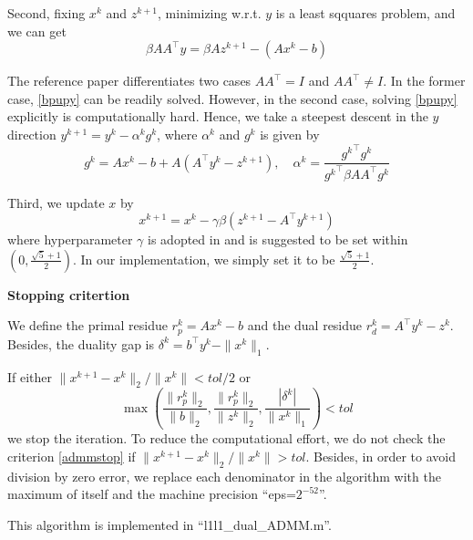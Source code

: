\documentclass[conference,onecolumn,12pt]{IEEEtran}
\newcommand{\<}{\langle}
\renewcommand{\>}{\rangle}
\numberwithin{equation}{section}
\begin{document}
Second, fixing $x^k$ and $z^{k+1}$, minimizing w.r.t. $y$ is a least sqquares problem, and we can get
\begin{equation}
    \label{bpupy}
    \beta AA^\top y = \beta A z^{k+1}-(Ax^k-b)
\end{equation}

The reference paper \cite{yang2011alternating} differentiates two cases $AA^\top=I$ and $AA^\top \neq I$. In the former case, \ref{bpupy} can be readily solved. However, in the second case, solving \ref{bpupy} explicitly is computationally hard. Hence, we take a steepest descent in the $y$ direction $y^{k+1}=y^k-\alpha^k g^k$, where $\alpha^k$ and $g^k$ is given by
\begin{equation}
    g^k = Ax^k-b +A(A^\top y^k-z^{k+1}),\quad \alpha^k = \frac{{g^k}^\top g^k}{{g^k}^\top\beta AA^\top g^k}
\end{equation}

Third, we update $x$ by 
\begin{equation}
    \label{bpupx}
    x^{k+1} = x^k-\gamma \beta(z^{k+1}-A^\top y^{k+1})
\end{equation}
where hyperparameter $\gamma$ is adopted in \cite{yang2011alternating} and is suggested to be set within $(0,\frac{\sqrt{5}+1}{2})$. In our implementation, we simply set it to be $\frac{\sqrt{5}+1}{2}$.

{\bf Stopping critertion}

We define the primal residue $r_p^k=Ax^k-b$ and the dual residue $r_d^k = A^\top y^k-z^k$. Besides, the duality gap is $\delta^k = b^\top y^k-\|x^k\|_1$. 

If either $\|x^{k+1}-x^k\|_2/\|x^k\| < tol/2$ or
\begin{equation}
    \label{admmstop}
    \max\left(
        \frac{\|r_p^k\|_2}{\|b\|_2}, \frac{\|r_p^k\|_2}{\|z^k\|_2}, \frac{|\delta^k|}{\|x^k\|_1}
    \right)<tol
\end{equation}
we stop the iteration. To reduce the computational effort, we do not check the criterion \ref{admmstop} if $\|x^{k+1}-x^k\|_2/\|x^k\| > tol$. Besides, in order to avoid division by zero error, we replace each denominator in the algorithm with the maximum of itself and the machine precision ``eps=$2^{-52}$''. 

This algorithm is implemented in ``l1l1\_dual\_ADMM.m''.
\end{document}

